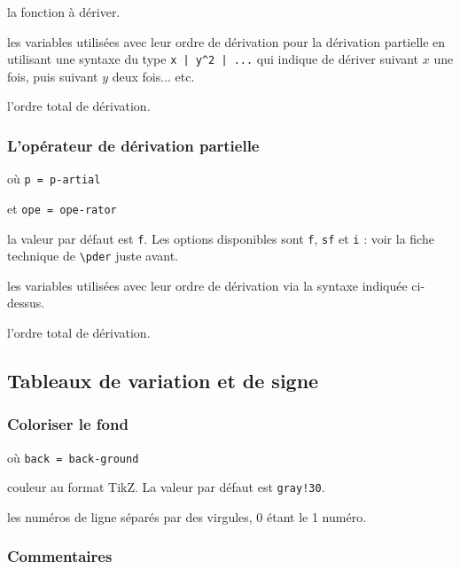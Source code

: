 \documentclass[12pt,a4paper]{article}
\newcommand\env[1]{\texttt{#1}}
\newcommand\macro[1]{\env{\textbackslash{}#1}}
\theoremstyle{definition}
\newcommand\mwhyprefix[2]{%
	\texttt{#1 = #1-#2}%
}
\begin{document}
 la fonction à dériver.

 les variables utilisées avec leur ordre de dérivation pour la dérivation partielle en utilisant une syntaxe du type \verb+x | y^2 | ...+ qui indique de dériver suivant $x$ une fois, puis suivant $y$ deux fois... etc.

 l'ordre total de dérivation.




\subsubsection{L'opérateur de dérivation partielle} \label{tnsana-ope-partial-der}



 où \quad \mwhyprefix{p}{artial}
                              et \mwhyprefix{ope}{rator}

\IDoption{} la valeur par défaut est \verb+f+. Les options disponibles sont \verb+f+, \verb+sf+ et \verb+i+ : voir la fiche technique de \macro{pder} juste avant.

 les variables utilisées avec leur ordre de dérivation via la syntaxe indiquée ci-dessus.

 l'ordre total de dérivation.











\subsection{Tableaux de variation et de signe}



\subsubsection{Coloriser le fond}

  où \quad \mwhyprefix{back}{ground}


\IDoption{} couleur au format TikZ.
            La valeur par défaut est \verb+gray!30+.


 les numéros de ligne séparés par des virgules, $0$ étant le 1\ier{} numéro.




\subsubsection{Commentaires}
\end{document}

